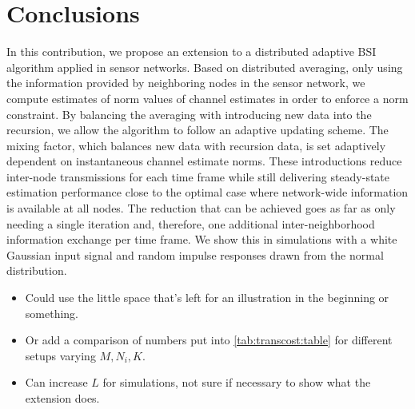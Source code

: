 \documentclass{article}
\begin{document}
\section[]{Conclusions}
\label{sec:conclusions}
In this contribution, we propose an extension to a distributed adaptive BSI algorithm applied in sensor networks.
Based on distributed averaging, only using the information provided by neighboring nodes in the sensor network, we compute estimates of norm values of channel estimates in order to enforce a norm constraint.
By balancing the averaging with introducing new data into the recursion, we allow the algorithm to follow an adaptive updating scheme.
The mixing factor, which balances new data with recursion data, is set adaptively dependent on instantaneous channel estimate norms.
These introductions reduce inter-node transmissions for each time frame while still delivering steady-state estimation performance close to the optimal case where network-wide information is available at all nodes.
The reduction that can be achieved goes as far as only needing a single iteration and, therefore, one additional inter-neighborhood information exchange per time frame.
We show this in simulations with a white Gaussian input signal and random impulse responses drawn from the normal distribution.
\begin{todo}
    \begin{itemize}
        \item Could use the little space that's left for an illustration in the beginning or something.
        \item Or add a comparison of numbers put into \autoref{tab:transcost:table} for different setups varying \(M,N_i,K\).
        \item Can increase \(L\) for simulations, not sure if necessary to show what the extension does.
    \end{itemize}
\end{todo}

\end{document}
